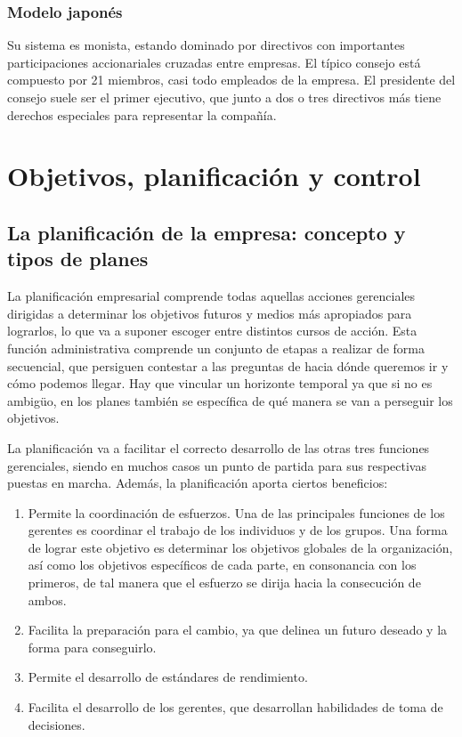 \documentclass[12pt,a4paper,spanish]{report}
\begin{document}
		\subsection{\textcolor[rgb]{0.9,0.3,0.3}Modelo japonés}
			Su sistema es monista, estando dominado por directivos con importantes participaciones accionariales cruzadas entre empresas. El típico consejo está compuesto por 21 miembros, casi todo empleados de la empresa. El presidente del consejo suele ser el primer ejecutivo, que junto a dos o tres directivos más tiene derechos especiales para representar la compañía.

\chapter{\textcolor[rgb]{0.3,0.6,0.4}{Objetivos, planificación y control}}
	\section{\textcolor[rgb]{0.3,0.6,0.4}La planificación de la empresa: concepto y tipos de planes}
		La planificación empresarial comprende todas aquellas acciones gerenciales dirigidas a determinar los objetivos futuros y medios más apropiados para lograrlos, lo que va a suponer escoger entre distintos cursos de acción. Esta función administrativa comprende un conjunto de etapas a realizar de forma secuencial, que persiguen contestar a las preguntas de hacia dónde queremos ir y cómo podemos llegar. Hay que vincular un horizonte temporal ya que si no es ambigüo, en los planes también se específica de qué manera se van a perseguir los objetivos.

		La planificación va a facilitar el correcto desarrollo de las otras tres funciones gerenciales, siendo en muchos casos un punto de partida para sus respectivas puestas en marcha. Además, la planificación aporta ciertos beneficios:
		\begin{enumerate}[-]
			\item Permite la coordinación de esfuerzos. Una de las principales funciones de los gerentes es coordinar el trabajo de los individuos y de los grupos. Una forma de lograr este objetivo es determinar los objetivos globales de la organización, así como los objetivos específicos de cada parte, en consonancia con los primeros, de tal manera que el esfuerzo se dirija hacia la consecución de ambos.

			\item Facilita la preparación para el cambio, ya que delinea un futuro deseado y la forma para conseguirlo.

			\item Permite el desarrollo de estándares de rendimiento.

			\item Facilita el desarrollo de los gerentes, que desarrollan habilidades de toma de decisiones.
		\end{enumerate}
\end{document}
